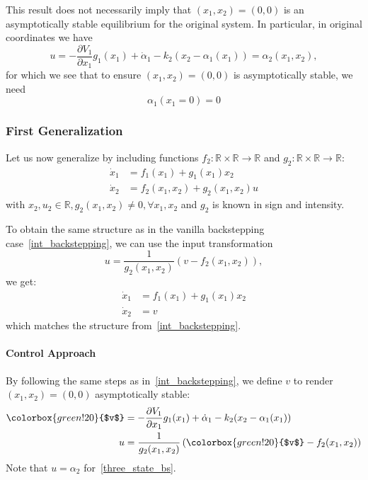 This result does not necessarily imply that $(x_1, x_2) = (0, 0)$ is an asymptotically stable equilibrium for the original system. In particular, in original coordinates we have
\begin{equation*}
    u = -\frac{\partial V_1}{\partial x_1}g_1(x_1) + \dot{\alpha}_1 - k_2(x_2 - \alpha_1(x_1)) = \alpha_2(x_1, x_2),
\end{equation*}
for which we see that to ensure $(x_1, x_2) = (0, 0)$ is asymptotically stable, we need
\begin{equation*}
    \alpha_1(x_1=0) = 0
\end{equation*}

\subsubsection{First Generalization}
Let us now generalize by including functions $f_2 : \mathbb{R} \times \mathbb{R} \to \mathbb{R}$ and $g_2 : \mathbb{R} \times \mathbb{R} \to \mathbb{R}$:
\begin{align*}
    \dot{x}_1 & = f_1(x_1) + g_1(x_1)x_2         \\
    \dot{x}_2 & = f_2(x_1, x_2) + g_2(x_1, x_2)u
\end{align*}
with $x_2, u_2 \in \mathbb{R}, g_2(x_1, x_2) \neq 0, \forall x_1, x_2$ and $g_2$ is known in sign and intensity.

\label{virtual_control_input}

To obtain the same structure as in the vanilla backstepping case~\ref{int_backstepping}, we can use the input transformation
\begin{equation*}
    u = \frac{1}{g_2(x_1, x_2)} (v - f_2(x_1, x_2)),
\end{equation*}
we get:
\begin{align*}
    \dot{x}_1 & = f_1(x_1) + g_1(x_1)x_2 \\
    \dot{x}_2 & = v
\end{align*}
which matches the structure from~\ref{int_backstepping}.

\paragraph{Control Approach}

By following the same steps as in~\ref{int_backstepping}, we define $v$ to render $(x_1, x_2) = (0, 0)$ asymptotically stable:
\begin{align*}
    \colorbox{green!20}{$v$} & =-\frac{\partial V_1}{\partial x_1}g_1(x_1) + \dot{\alpha}_1 - k_2(x_2 - \alpha_1(x_1)) \\
    u                        & = \frac{1}{g_2(x_1, x_2)}\left(\colorbox{green!20}{$v$} - f_2(x_1, x_2)\right)
\end{align*}
Note that $u=\alpha_2$ for~\ref{three_state_bs}.

